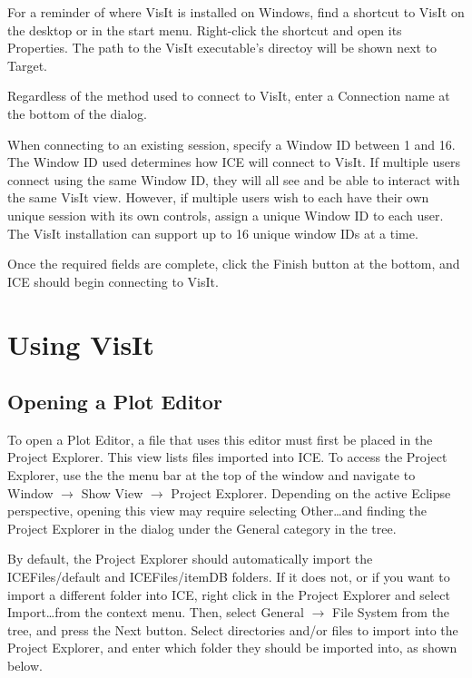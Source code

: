 For a reminder of where VisIt is installed on Windows, find a shortcut to
VisIt on the desktop or in the start menu. Right-click the shortcut and open its
Properties. The path to the VisIt executable's directoy will be shown next to
Target.

Regardless of the method used to connect to VisIt, enter a Connection
name at the bottom of the dialog. 

When connecting to an existing session, specify a Window ID between 1 and 16.
The Window ID used determines how ICE will connect to VisIt. If multiple users
connect using the same Window ID, they will all see and be able to interact with
the same VisIt view. However, if multiple users wish to each have their own
unique session with its own controls, assign a unique Window ID to each user.
The VisIt installation can support up to 16 unique window IDs at a time.

Once the required fields are complete, click the Finish button at the bottom,
and ICE should begin connecting to VisIt.

\section{Using VisIt}

\subsection{Opening a Plot Editor} 

To open a Plot Editor, a file that uses this editor must first be placed in the
Project Explorer. This view lists files imported into ICE. To access the Project
Explorer, use the the menu bar at the top of the window and navigate to Window
$\rightarrow$ Show View $\rightarrow$ Project Explorer. Depending on the active
Eclipse perspective, opening this view may require selecting Other\ldots and
finding the Project Explorer in the dialog under the General category in the
tree.

By default, the Project Explorer should automatically import the
ICEFiles/default and ICEFiles/itemDB folders. If it does not, or if you want to
import a different folder into ICE, right click in the Project Explorer and
select Import\ldots from the context menu. Then, select General $\rightarrow$
File System from the tree, and press the Next button. Select directories and/or
files to import into the Project Explorer, and enter which folder they should
be imported into, as shown below.

